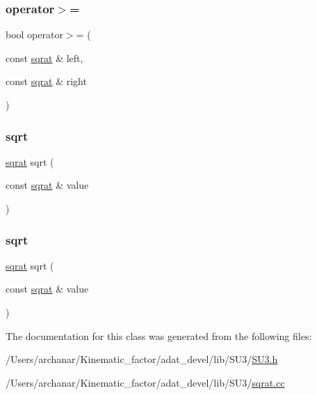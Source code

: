 \mbox{\label{classsqrat_adac0450048dc40c698aa22f334e280a1}} 
\subsubsection{\texorpdfstring{operator$>$=}{operator>=}\hspace{0.1cm}{\footnotesize\ttfamily [2/2]}}
{\footnotesize\ttfamily bool operator$>$= (\begin{DoxyParamCaption}\item[{const \mbox{\hyperlink{classsqrat}{sqrat}} \&}]{left,  }\item[{const \mbox{\hyperlink{classsqrat}{sqrat}} \&}]{right }\end{DoxyParamCaption})\hspace{0.3cm}{\ttfamily [friend]}}

\mbox{\label{classsqrat_aac93909598aa6f1b1b6bbe035a1af815}} 
\subsubsection{\texorpdfstring{sqrt}{sqrt}\hspace{0.1cm}{\footnotesize\ttfamily [1/2]}}
{\footnotesize\ttfamily \mbox{\hyperlink{classsqrat}{sqrat}} sqrt (\begin{DoxyParamCaption}\item[{const \mbox{\hyperlink{classsqrat}{sqrat}} \&}]{value }\end{DoxyParamCaption})\hspace{0.3cm}{\ttfamily [friend]}}

\mbox{\label{classsqrat_aac93909598aa6f1b1b6bbe035a1af815}} 
\subsubsection{\texorpdfstring{sqrt}{sqrt}\hspace{0.1cm}{\footnotesize\ttfamily [2/2]}}
{\footnotesize\ttfamily \mbox{\hyperlink{classsqrat}{sqrat}} sqrt (\begin{DoxyParamCaption}\item[{const \mbox{\hyperlink{classsqrat}{sqrat}} \&}]{value }\end{DoxyParamCaption})\hspace{0.3cm}{\ttfamily [friend]}}



The documentation for this class was generated from the following files\+:\begin{DoxyCompactItemize}
\item 
/\+Users/archanar/\+Kinematic\+\_\+factor/adat\+\_\+devel/lib/\+S\+U3/\mbox{\hyperlink{lib_2SU3_2SU3_8h}{S\+U3.\+h}}\item 
/\+Users/archanar/\+Kinematic\+\_\+factor/adat\+\_\+devel/lib/\+S\+U3/\mbox{\hyperlink{sqrat_8cc}{sqrat.\+cc}}\end{DoxyCompactItemize}
